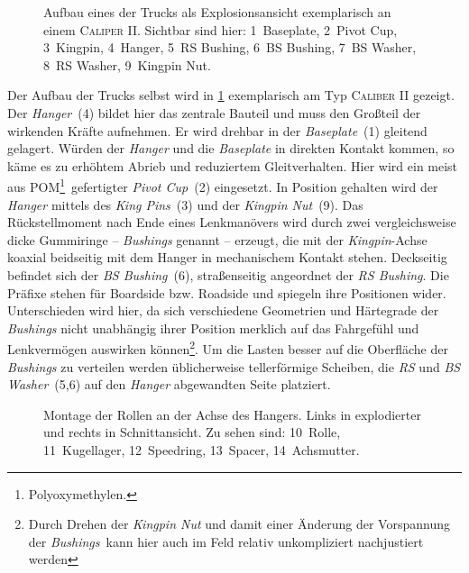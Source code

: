 		\begin{figure}[h]
			\centering
			
			\caption[Explosionsansicht eines der Trucks]{Aufbau eines der Trucks als Explosionsansicht exemplarisch an einem \textsc{Caliper II}. Sichtbar sind hier: 1~Baseplate, 2~Pivot Cup, 3~Kingpin, 4~Hanger, 5~RS Bushing, 6~BS Bushing, 7~BS Washer, 8~RS Washer, 9~Kingpin Nut.}\label{fig:caliper exploded}
		\end{figure}
		Der Aufbau der Trucks selbst wird in \cref{fig:caliper exploded} exemplarisch am Typ \textsc{Caliber II} gezeigt.
		Der \textit{Hanger}~(4) bildet hier das zentrale Bauteil und muss den Großteil der wirkenden Kräfte aufnehmen.
		Er wird drehbar in der \textit{Baseplate}~(1) gleitend gelagert.
		Würden der \textit{Hanger} und die \textit{Baseplate} in direkten Kontakt kommen, so käme es zu erhöhtem Abrieb und reduziertem Gleitverhalten.
		Hier wird ein meist aus POM\footnote{Polyoxymethylen.}~gefertigter \textit{Pivot Cup}~(2) eingesetzt.
		In Position gehalten wird der \textit{Hanger} mittels des \textit{King Pins}~(3) und der \textit{Kingpin Nut}~(9).
		Das Rückstellmoment nach Ende eines Lenkmanövers wird durch zwei vergleichsweise dicke Gummiringe -- \textit{Bushings} genannt -- erzeugt, die mit der \textit{Kingpin}-Achse koaxial beidseitig mit dem Hanger in mechanischem Kontakt stehen.
		Deckseitig befindet sich der \textit{BS Bushing}~(6), straßenseitig angeordnet der \textit{RS Bushing}.
		Die Präfixe stehen für Boardside bzw. Roadside und spiegeln ihre Positionen wider.
		Unterschieden wird hier, da sich verschiedene Geometrien und Härtegrade der \textit{Bushings} nicht unabhängig ihrer Position merklich auf das Fahrgefühl und Lenkvermögen auswirken können\footnote{Durch Drehen der \textit{Kingpin Nut} und damit einer Änderung der Vorspannung der \textit{Bushings}~kann hier auch im Feld relativ unkompliziert nachjustiert werden}.
		Um die Lasten besser auf die Oberfläche der \textit{Bushings} zu verteilen werden üblicherweise tellerförmige Scheiben, die \textit{RS} und \textit{BS Washer}~(5,6) auf den \textit{Hanger} abgewandten Seite platziert.\par\medskip
		\begin{figure}[h]
			\centering
			
			\caption[Montage der Rollen an der Achse des Hanger]{Montage der Rollen an der Achse des Hangers. Links in explodierter und rechts in Schnittansicht. Zu sehen sind: 10~Rolle, 11~Kugellager, 12~Speedring, 13~Spacer, 14~Achsmutter.}\label{fig:wheel NT exploded}
		\end{figure}

